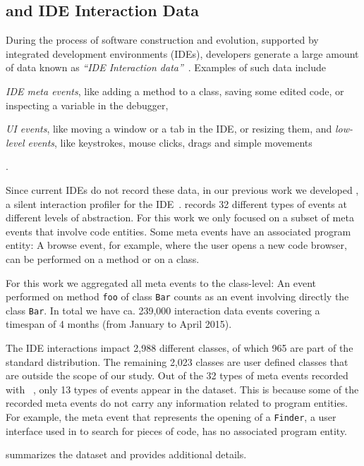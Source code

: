 \subsection{\dfl and IDE Interaction Data}\label{sub:interaction}

During the process of software construction and evolution, supported by integrated development environments (IDEs), developers generate a large amount of data known as \emph{``IDE Interaction data''}~\cite{Kers2005, Murp2006}.
Examples of such data include \begin{inparaenum}[i)] \item \emph{IDE meta events}, like adding a method to a class, saving some edited code, or inspecting a variable in the debugger, \item \emph{UI events}, like moving a window or a tab in the IDE, or resizing them, and \emph{low-level events}, like keystrokes, mouse clicks, drags and simple movements\end{inparaenum}.

Since current IDEs do not record these data, in our previous work we developed \dfl, a silent interaction profiler for the \pha IDE~\cite{Mine2015b}.
\dfl records 32 different types of events at different levels of abstraction.
For this work we only focused on a subset of meta events that involve code entities.
Some meta events have an associated program entity: A browse event, for example, where the user opens a new code browser, can be performed on a method or on a class.

For this work we aggregated all meta events to the class-level: An event performed on method \texttt{foo} of class \texttt{Bar} counts as an event involving directly the class \texttt{Bar}.
In total we have ca.
239,000 interaction data events covering a timespan of 4 months (\ie from January to April 2015).

The IDE interactions impact 2,988 different classes, of which 965 are part of the standard \pha distribution.
The remaining 2,023 classes are user defined classes that are outside the scope of our study.
Out of the 32 types of meta events recorded with \dfl~\cite{Mine2015b}, only 13 types of events appear in the dataset.
This is because some of the recorded meta events do not carry any information related to program entities.
For example, the meta event that represents the opening of a \texttt{Finder}, a user interface used in \pha to search for pieces of code, has no associated program entity.

 summarizes the dataset and provides additional details.

